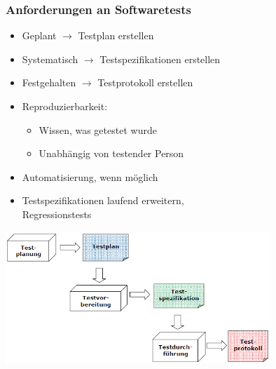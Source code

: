 \begin{multicols}{2}	
\subsubsection{Anforderungen an Softwaretests}
	\begin{minipage}{12cm}
	\begin{itemize}
			\item Geplant $\rightarrow$ Testplan erstellen
			\item Systematisch $\rightarrow$ Testspezifikationen erstellen
			\item Festgehalten $\rightarrow$ Testprotokoll erstellen
			\item Reproduzierbarkeit:
			\begin{itemize}
				\item Wissen, was getestet wurde
				\item Unabhängig von testender Person
			\end{itemize}
			\item Automatisierung, wenn möglich
			\item Testspezifikationen laufend erweitern,\\
			Regressionstests
		\end{itemize}
	\end{minipage}
		\begin{minipage}{10cm}
			\includegraphics[width=10cm]{images/sofwaretest.png}
		\end{minipage}
\end{multicols}

